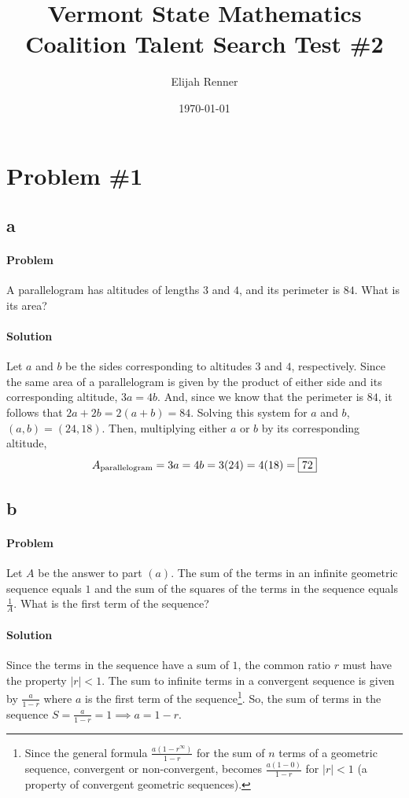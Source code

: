 \documentclass[10pt]{article}
\title{Vermont State Mathematics Coalition Talent Search Test \#2}
\author{Elijah Renner}
\date{\today}
\theoremstyle{plain}
\theoremstyle{definition}
\theoremstyle{remark}
\begin{document}
\maketitle
\tableofcontents

\section{Problem \#1}

\subsection{a}

\paragraph{Problem} A parallelogram has altitudes of lengths \(3\) and \(4\), and its perimeter is \(84\). What is its area?

\paragraph{Solution} Let \(a\) and \(b\) be the sides corresponding to altitudes \(3\) and \(4\), respectively. Since the same area of a parallelogram is given by the product of either side and its corresponding altitude, \(3a=4b\). And, since we know that the perimeter is \(84\), it follows that \(2a+2b=2(a+b)=84\). Solving this system for \(a\) and \(b\), \((a,b)= (24,18)\). Then, multiplying either \(a\) or \(b\) by its corresponding altitude, \[A_{\text{parallelogram}}=3a=4b=3(24)=4(18)=\fbox{72}\]

\subsection{b}

\paragraph{Problem} Let \(A\) be the answer to part \((a)\). The sum of the terms in an infinite geometric sequence equals \(1\) and the sum of the squares of the terms in the sequence equals \(\frac{1}{A}\). What is the first term of the sequence?

\paragraph{Solution} Since the terms in the sequence have a sum of \(1\), the common ratio \(r\) must have the property \(|r|<1\). The sum to infinite terms in a convergent sequence is given by \(\frac{a}{1-r}\) where \(a\) is the first term of the sequence\footnote{Since the general formula \(\frac{a(1-r^\infty)}{1-r}\) for the sum of \(n\) terms of a geometric sequence, convergent or non-convergent, becomes \(\frac{a(1-0)}{1-r}\) for \(|r|<1\) (a property of convergent geometric sequences).}. So, the sum of terms in the sequence \(S=\frac{a}{1-r}=1\implies a=1-r\). 
\end{document}
